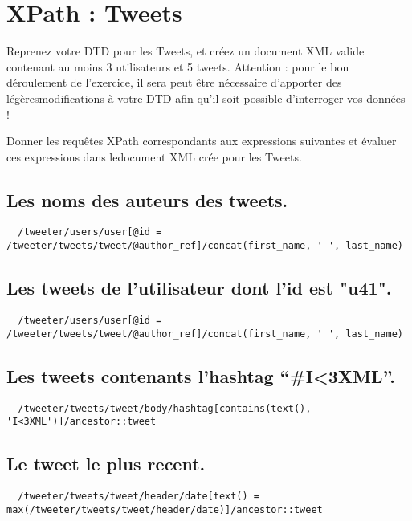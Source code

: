 \chapter{XPath : Tweets}

Reprenez votre DTD pour les Tweets, et créez un document XML valide contenant au moins 3 utilisateurs et 5 tweets. Attention : pour le bon déroulement de l’exercice, il sera peut être nécessaire d’apporter des légèresmodifications à votre DTD afin qu’il soit possible d’interroger vos données !

Donner  les  requêtes  XPath  correspondants  aux  expressions  suivantes  et  évaluer  ces  expressions  dans  ledocument XML crée pour les Tweets.

\section{Les noms des auteurs des tweets.}
\begin{verbatim}
  /tweeter/users/user[@id = /tweeter/tweets/tweet/@author_ref]/concat(first_name, ' ', last_name)
\end{verbatim}

\section{Les tweets de l’utilisateur dont l’id est "u41".}
\begin{verbatim}
  /tweeter/users/user[@id = /tweeter/tweets/tweet/@author_ref]/concat(first_name, ' ', last_name)
\end{verbatim}

\section{Les tweets contenants l’hashtag “\#I<3XML”.}
\begin{verbatim}
  /tweeter/tweets/tweet/body/hashtag[contains(text(), 'I<3XML')]/ancestor::tweet
\end{verbatim}

\section{Le tweet le plus recent.}
\begin{verbatim}
  /tweeter/tweets/tweet/header/date[text() = max(/tweeter/tweets/tweet/header/date)]/ancestor::tweet
\end{verbatim}

